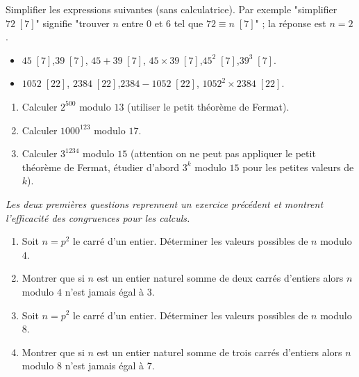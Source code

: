 \documentclass[11pt,class=report,crop=false]{standalone}
\begin{document}
    




\bigskip
\bigskip






\exercice{}

\enonce
Simplifier les expressions suivantes (sans calculatrice). Par exemple "simplifier $72 \; [7]$" signifie "trouver $n$ entre $0$ et $6$ tel que $72 \equiv n \; [7]$" ; la réponse est $n=2$.
\begin{itemize}
    \item $45 \; [7]$,\quad $39 \; [7]$, \quad $45+39 \; [7]$, \quad $45 \times 39 \; [7]$,\quad $45^2 \; [7]$,\quad  $39^3 \; [7]$.
    \item $1052 \; [22]$, \quad $2384 \; [22]$,\quad  $2384-1052 \; [22]$, \quad $1052^2 \times 2384 \; [22]$.
\end{itemize} 
\finenonce


\finexercice


\exercice{}
\enonce
\sauteligne
\begin{enumerate}
    \item Calculer $2^{500}$ modulo $13$ (utiliser le petit théorème de Fermat).
    \item Calculer $1000^{123}$ modulo $17$.  
    \item Calculer $3^{1234}$ modulo $15$ (attention on ne peut pas appliquer le petit théorème de Fermat, étudier d'abord $3^k$ modulo $15$ pour les petites valeurs de $k$).
\end{enumerate} 
\finenonce


\finexercice




\exercice{}

\enonce
\emph{Les deux premières questions reprennent un exercice précédent et montrent l'efficacité des congruences pour les calculs.}
\begin{enumerate}
    \item Soit $n=p^2$ le carré d'un entier. Déterminer les valeurs possibles de $n$ modulo $4$.
    
    \item Montrer que si $n$ est un entier naturel somme de deux carrés d'entiers 
    alors $n$ modulo $4$ n'est jamais égal à $3$.
    
    \item Soit $n=p^2$ le carré d'un entier. Déterminer les valeurs possibles de $n$ modulo $8$.
        
    \item Montrer que si $n$ est un entier naturel somme de trois carrés d'entiers 
    alors $n$ modulo $8$ n'est jamais égal à $7$.
\end{enumerate} 
\finenonce
\end{document}
